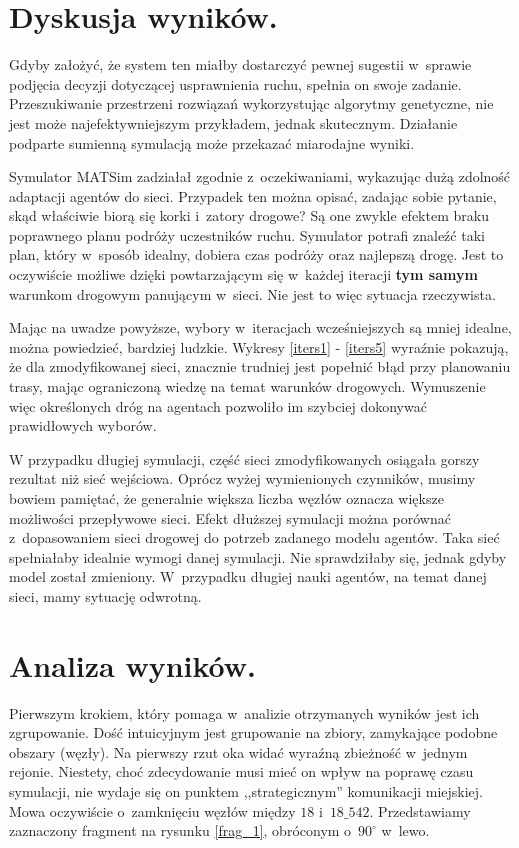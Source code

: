 \documentclass[twoside,12pt]{report}
\begin{document}
\section{Dyskusja wyników.}
Gdyby założyć, że system ten miałby dostarczyć pewnej sugestii w~sprawie podjęcia decyzji dotyczącej usprawnienia ruchu, spełnia on swoje zadanie. Przeszukiwanie przestrzeni rozwiązań wykorzystując algorytmy genetyczne, nie jest może najefektywniejszym przykładem, jednak skutecznym. Działanie podparte sumienną symulacją może przekazać miarodajne wyniki.

Symulator MATSim zadziałał zgodnie z~oczekiwaniami, wykazując dużą zdolność adaptacji agentów do sieci. Przypadek ten można opisać, zadając sobie pytanie, skąd właściwie biorą się korki i~zatory drogowe? Są one zwykle efektem braku poprawnego planu podróży uczestników ruchu. Symulator potrafi znaleźć taki plan, który w~sposób idealny, dobiera czas podróży oraz najlepszą drogę. Jest to oczywiście możliwe dzięki powtarzającym się w~każdej iteracji \textbf{tym samym} warunkom drogowym panującym w~sieci. Nie jest to więc sytuacja rzeczywista.

Mając na uwadze powyższe, wybory w~iteracjach wcześniejszych są mniej idealne, można powiedzieć, bardziej ludzkie. Wykresy \ref{iters1} - \ref{iters5} wyraźnie pokazują, że dla zmodyfikowanej sieci, znacznie trudniej jest popełnić błąd przy planowaniu trasy, mając ograniczoną wiedzę na temat warunków drogowych. Wymuszenie więc określonych dróg na agentach pozwoliło im szybciej dokonywać prawidłowych wyborów.

W przypadku długiej symulacji, część sieci zmodyfikowanych osiągała gorszy rezultat niż sieć wejściowa. Oprócz wyżej wymienionych czynników, musimy bowiem pamiętać, że generalnie większa liczba węzłów oznacza większe możliwości przepływowe sieci. Efekt dłuższej symulacji można porównać z~dopasowaniem sieci drogowej do potrzeb zadanego modelu agentów. Taka sieć spełniałaby idealnie wymogi danej symulacji. Nie sprawdziłaby się, jednak gdyby model został zmieniony. W~przypadku długiej nauki agentów, na temat danej sieci, mamy sytuację odwrotną.

\section{Analiza wyników.}
Pierwszym krokiem, który pomaga w~analizie otrzymanych wyników jest ich zgrupowanie. Dość intuicyjnym jest grupowanie na zbiory, zamykające podobne obszary (węzły). Na pierwszy rzut oka widać wyraźną zbieżność w~jednym rejonie. Niestety, choć zdecydowanie musi mieć on wpływ na poprawę czasu symulacji, nie wydaje się on punktem ,,strategicznym'' komunikacji miejskiej. Mowa oczywiście o~zamknięciu węzłów między $18$ i~$18\_542$. Przedstawiamy zaznaczony fragment na rysunku \ref{frag_1}, obróconym o~$90^{\circ}$ w~lewo.
\end{document}
